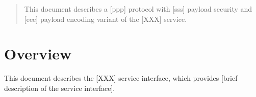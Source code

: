 \documentclass[a4paper]{arrowhead}
\begin{document}
\ArrowheadDate{\today}
\ArrowheadSetup

\begin{center}
  \vspace*{1cm}
  \huge{\arrowtitle}

  \vspace*{0.2cm}
  \LARGE{\arrowtype}
  \vspace*{1cm}
\end{center}

  \vspace*{\fill}


  \vspace*{1cm}
  \vspace*{\fill}

  \begin{abstract}
    This document describes a [ppp] protocol with [sss] payload
    security and [eee] payload encoding variant of the [XXX] service.
  \end{abstract}
  \vspace*{1cm}

\newpage

\tableofcontents
\newpage

\section{Overview}
\label{sec:overview}

This document describes the [XXX] service interface,
which provides [brief description of the service interface].
\end{document}

